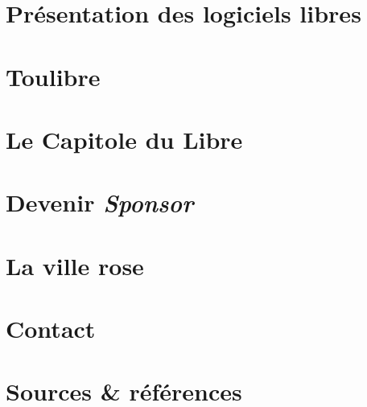 \documentclass{cdl_sponsor}
\begin{document}

\section{Présentation des logiciels libres}

	

\section{Toulibre}

	

\section{Le Capitole du Libre}

	

\section{Devenir \textit{Sponsor}}

	

\section{La ville rose}

	
	
\section{Contact}

	

\section{Sources \& références}

	
\end{document}
